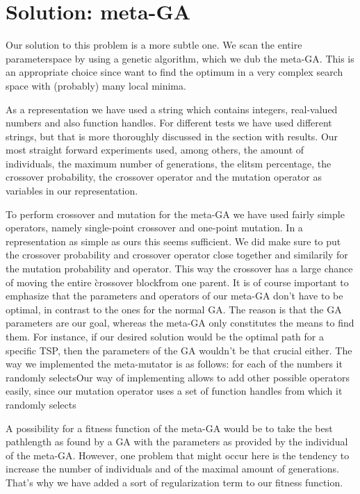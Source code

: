 \documentclass[a4paper]{article}
\begin{document}
\section{Solution: meta-GA}

Our solution to this problem is a more subtle one. We scan the entire parameterspace by using a genetic algorithm, which we dub the meta-GA. This is an appropriate choice since want to find the optimum in a very complex search space with (probably) many local minima. 
\par
As a representation we have used a string which contains integers, real-valued numbers and also function handles. For different tests we have used different strings, but that is more thoroughly discussed in the section with results. Our most straight forward experiments used, among others, the amount of individuals, the maximum number of generations, the elitsm percentage, the crossover probability, the crossover operator and the mutation operator as variables in our representation.
\par
To perform crossover and mutation for the meta-GA we have used fairly simple operators, namely single-point crossover and one-point mutation. In a representation as simple as ours this seems sufficient. We did make sure to put the crossover probability and crossover operator close together and similarily for the mutation probability and operator. This way the crossover has a large chance of moving the entire \`crossover block\' from one parent. It is of course important to emphasize that the parameters and operators of our meta-GA don't have to be optimal, in contrast to the ones for the normal GA. The reason is that the GA parameters are our goal, whereas the meta-GA only constitutes the means to find them. For instance, if our desired solution would be the optimal path for a specific TSP, then the parameters of the GA wouldn't be that crucial either. The way we implemented the meta-mutator is as follows: for each of the numbers it randomly selectsOur way of implementing allows to add other possible operators easily, since our mutation operator uses a set of function handles from which it randomly selects
\par
A possibility for a fitness function of the meta-GA would be to take the best pathlength as found by a GA with the parameters as provided by the individual of the meta-GA. However, one problem that might occur here is the tendency to increase the number of individuals and of the maximal amount of generations. That's why we have added a sort of regularization term to our fitness function.
\end{document}
